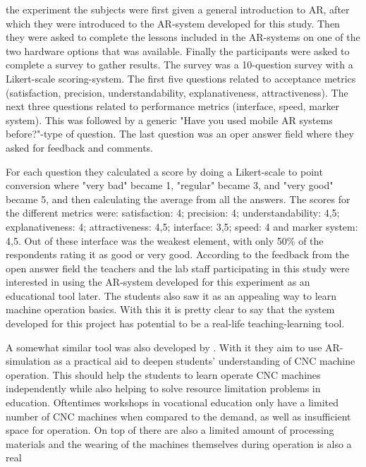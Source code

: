 the experiment the subjects were first given a general introduction to AR, 
after which they were introduced to the AR-system developed for this study. 
Then they were asked to complete the lessons included in the AR-systems on 
one of the two hardware options that was available. Finally the participants 
were asked to complete a survey to gather results.\cite{reyesEtAl2016} The 
survey was a 10-question survey with a Likert-scale scoring-system. The first 
five questions related to acceptance metrics (satisfaction, precision, 
understandability, explanativeness, attractiveness). The next three questions 
related to performance metrics (interface, speed, marker system). This was 
followed by a generic "Have you used mobile AR systems before?"-type of 
question. The last question was an oper answer field where they asked for 
feedback and comments.\cite{reyesEtAl2016}\par
	For each question they calculated a score by doing a Likert-scale to 
point conversion where "very bad" became 1, "regular" became 3, and "very 
good" became 5, and then calculating the average from all the answers. The 
scores for the different metrics were: satisfaction: 4; precision: 4; 
understandability: 4,5; explanativeness: 4; attractiveness: 4,5; interface: 
3,5; speed: 4 and marker system: 4,5. Out of these interface was the weakest 
element, with only 50\% of the respondents rating it as good or very 
good.\cite{reyesEtAl2016} According to the feedback from the open answer 
field the teachers and the lab staff participating in this study were 
interested in using the AR-system developed for this experiment as an 
educational tool later. The students also saw it as an appealing way to learn 
machine operation basics.\cite{reyesEtAl2016} With this it is pretty clear to 
say that the system developed for this project has potential to be a 
real-life teaching-learning tool.\par
	A somewhat similar tool was also developed by 
\textcite{LinAndLee2020}. With it they aim to use AR-simulation as a 
practical aid to deepen students' understanding of CNC machine operation. 
This should help the students to learn operate CNC machines independently 
while also helping to solve resource limitation problems in education. 
Oftentimes workshops in vocational education only have a limited number of 
CNC machines when compared to the demand, as well as insufficient space for 
operation. On top of there are also a limited amount of processing materials 
and the wearing of the machines themselves during operation is also a real 
